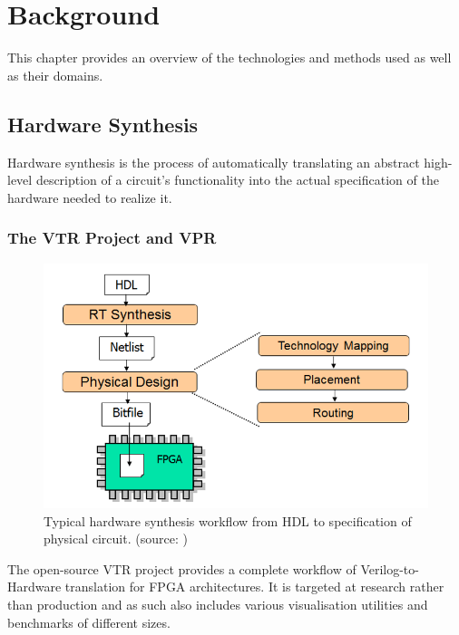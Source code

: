 
\chapter{Background}\label{ch:relatedwork}
\glsresetall %

This chapter provides an overview of the technologies and methods used as well as their domains.

\section{Hardware Synthesis}

Hardware synthesis is the process of automatically translating an abstract high-level description of a circuit's functionality into the actual specification of the hardware needed to realize it.

\subsection{The VTR Project and VPR}

\begin{figure}
	\includegraphics[width=\linewidth]{plots/hardware-synthesis.png}
	\caption{Typical hardware synthesis workflow from \gls{HDL} to specification of physical circuit. (source: \cite{hardware-synthesis-plot})}
	\label{fig:hardware-synthesis}
\end{figure}

The open-source \gls{VTR} project\cite{vtr8} provides a complete workflow of Verilog-to-Hardware translation for \gls{FPGA} architectures. It is targeted at research rather than production and as such also includes various visualisation utilities and benchmarks of different sizes.

